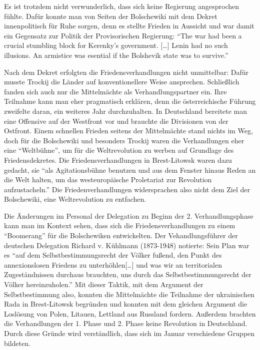 \documentclass{../../sem_paper}
\begin{document}
Es ist trotzdem nicht verwunderlich, dass sich keine Regierung angesprochen fühlte. Dafür konnte man von Seiten der Bolschewiki mit dem Dekret innenpolitisch für Ruhe sorgen, denn es stellte Frieden in Aussicht und war damit ein Gegensatz zur Politik der Provisorischen Regierung: "`The war had been a crucial stumbling block for Kerenky's government. [\ldots] Lenin had no such illusions. An armistice was esential if the Bolshevik state was to survive."'\autocite[39]{marples2011}

Nach dem Dekret erfolgten die Friedensverhandlungen nicht unmittelbar: Dafür musste Trockij die Länder auf konventionellere Weise ansprechen. Schließlich fanden sich auch nur die Mittelmächte als Verhandlungspartner ein. Ihre Teilnahme kann man eher pragmatisch erklären, denn die österreichische Führung zweifelte daran, ein weiteres Jahr durchzuhalten. In Deutschland bereitete man eine Offensive auf der Westfront vor und brauchte die Divisionen von der Ostfront. Einem schnellen Frieden seitens der Mittelmächte stand nichts im Weg, doch für die Bolschewiki und besonders Trockij waren die Verhandlungen eher eine "`Weltbühne"', um für die Weltrevolution zu werben auf Grundlage des Friedensdekretes. Die Friedensverhandlungen in Brest-Litowsk waren dazu gedacht, sie "`als Agitationsbühne benutzen und aus dem Fenster hinaus Reden an die Welt halten, um das westeuropäische Proletariat zur Revolution aufzustacheln."'\autocite[21]{baum1966}
Die Friedenverhandlungen widersprachen also nicht dem Ziel der Bolschewiki, eine Weltrevolution zu entfachen. 

Die Änderungen im Personal der Delegation zu Beginn der 2. Verhandlungsphase kann man im Kontext sehen, dass sich die Friedensverhandlungen zu einem "`Boomerang"'\autocite[17]{maka2010} für die Bolschewiken entwickelten. Der Vehandlungsführer der deutschen Delegation Richard v. Kühlmann (1873-1948) notierte: Sein Plan war es "`auf dem Selbstbestimmungsrecht der Völker fußend, den Punkt des annexionslosen Friedens zu unterhöhlen[\ldots] und was wir an territorialen Zugeständnissen durchaus brauchten, uns durch das Selbstbestimmungsrecht der Völker hereinzuholen."'\autocite[21]{baum1966}
Mit dieser Taktik, mit dem Argument der Selbstbestimmung also, konnten die Mittelmächte die Teilnahme der ukrainischen Rada in Brest-Litowsk begründen und konnten mit dem gleichen Argument die Loslösung von Polen, Litauen, Lettland aus Russland fordern. Außerdem brachten die Verhandlungen der 1. Phase und 2. Phase keine Revolution in Deutschland. Durch diese Gründe wird verständlich, dass sich im Januar verschiedene Gruppen bildeten.
\end{document}
